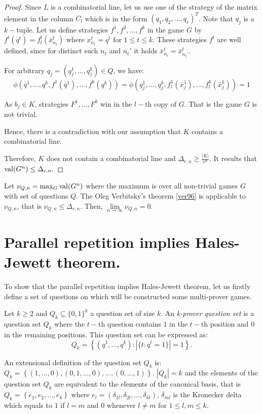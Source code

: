 \begin{proof}
Since $L$ is a combinatorial line, let us use one of the strategy of the matrix element in the column $C_l$ which is in the form $(q_1,q_2,\ldots,q_r)^T.$  Note that $q_j$ is a $k-$tuple. 
Let us define strategies $f^1,f^2, \ldots, f^k$ in the game $G$ by $f^t(q^t)=f_l^t(\bar{x}_{n_t}^t)$ where $x_{n_t}^t=q^t$ for $1\leq t \leq k.$ These strategies $f^t$ are well defined, since for distinct such $n_t$ and $n_t'$ it holds $\bar{x}_{n_t}^t= \bar{x}_{n_t'}^t.$ 

For  arbitrary $q_j= (q_j^1,\ldots, q_j^k) \in Q$, we have:
$$\phi (q^1,\ldots, q^k, f^1(q^1), \ldots, f^k(q^k))= \phi (q_j^1,\ldots, q_j^k, f_l^1(\bar{x}_j^1), \ldots, f_l^k(\bar{x}_j^k))=1$$

As $b_j \in K$, strategies $F^1, \ldots, F^k$ win in  the $l-$th copy of $G$. That is the game $G$ is not trivial. %

Hence, there is a contradiction with our assumption that $K$ contains a combinatorial line.

Therefore, $K$ does not contain a combinatorial line and $\Delta_{r,n} \geq  \frac{|K|}{r^n}$.
It results that $\mathrm{val} (G^n) \leq \Delta_{r,n}.$
\end{proof}

Let $\nu_{Q,n}=\max_G \mathrm{val} (G^n)$ where the maximum is over all non-trivial games $G$ with set of questions $Q.$ 
The Oleg Verbitsky's theorem \eqref{ver96} is applicable to $\nu_{Q,n}$, that is $\nu_{Q,n} \leq \Delta_{r,n}.$ Then, $\lim\limits_{n\longrightarrow \infty} \nu_{Q,n}=0.$

\section{Parallel repetition implies Hales-Jewett theorem.}
 
To show that the parallel repetition implies Hales-Jewett theorem, let us firstly define a set of questions on which will be constructed some multi-prover games.

\begin{defn}Let $k\geq 2$ and $Q_k \subseteq \{0,1\}^k$ a question set of size $k.$ An \textit{k-prover question set} is a question set $Q_k$ where the $t-$th question contains $1$ in the $t-$th position and $0$ in the remaining positions. This question set can be expressed as:
$$Q_k=\left\lbrace(q^1, \ldots, q^k): |\{t:q^t=1\}|=1\right\rbrace.$$		\end{defn}
 
 An extensional definition of the question set $Q_k$ is: $Q_k=\left\lbrace (1,\ldots,0), (0,1,\ldots,0), \ldots, (0,\ldots,1) \right\rbrace.$ $|Q_k|=k$ and the elements of the question set $Q_k$ are equivalent to the elements of the canonical basis, that is $Q_k= \left\lbrace e_1, e_2, \ldots, e_k\right\rbrace$ where $e_l=(\delta_{1l}, \delta_{2l}, \ldots, \delta_{kl} )$, $\delta_{ml}$ is the Kronecker delta which equals to $1$ if $l=m$ and $0$ whenever $l \neq m$ for $1 \leq l, m \leq  k.$ 
 
